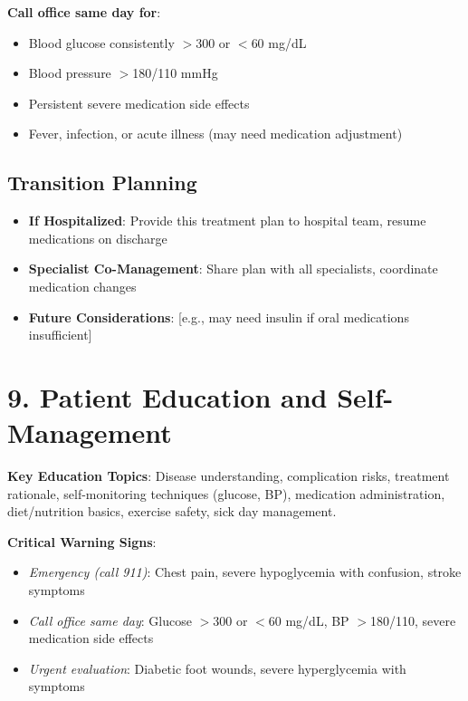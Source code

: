 \documentclass[11pt,letterpaper]{article}
\begin{document}
\textbf{Call office same day for}:
\begin{itemize}[leftmargin=*]
    \item Blood glucose consistently $>$300 or $<$60 mg/dL
    \item Blood pressure $>$180/110 mmHg
    \item Persistent severe medication side effects
    \item Fever, infection, or acute illness (may need medication adjustment)
\end{itemize}

\subsection*{Transition Planning}

\begin{itemize}[leftmargin=*]
    \item \textbf{If Hospitalized}: Provide this treatment plan to hospital team, resume medications on discharge
    \item \textbf{Specialist Co-Management}: Share plan with all specialists, coordinate medication changes
    \item \textbf{Future Considerations}: [e.g., may need insulin if oral medications insufficient]
\end{itemize}

\section*{9. Patient Education and Self-Management}

\textbf{Key Education Topics}: Disease understanding, complication risks, treatment rationale, self-monitoring techniques (glucose, BP), medication administration, diet/nutrition basics, exercise safety, sick day management.

\vspace{0.5em}
\textbf{Critical Warning Signs}:
\begin{itemize}[leftmargin=*,itemsep=0pt]
    \item \textit{Emergency (call 911)}: Chest pain, severe hypoglycemia with confusion, stroke symptoms
    \item \textit{Call office same day}: Glucose $>$300 or $<$60 mg/dL, BP $>$180/110, severe medication side effects
    \item \textit{Urgent evaluation}: Diabetic foot wounds, severe hyperglycemia with symptoms
\end{itemize}
\end{document}
